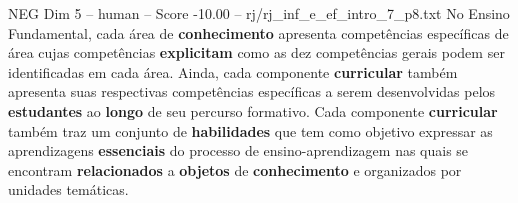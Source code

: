 \begin{textsample}{NEG Dim 5 – human – Score -10.00 – rj/rj\_inf\_e\_ef\_intro\_7\_p8.txt}  \label{ex:f5_neg_010}
No Ensino Fundamental, cada área de \textbf{conhecimento} apresenta competências específicas de área cujas competências \textbf{explicitam} como as dez competências gerais podem ser identificadas em cada área.
Ainda, cada componente \textbf{curricular} também apresenta suas respectivas competências específicas a serem desenvolvidas pelos \textbf{estudantes} ao \textbf{longo} de seu percurso formativo.
Cada componente \textbf{curricular} também traz um conjunto de \textbf{habilidades} que tem como objetivo expressar as aprendizagens \textbf{essenciais} do processo de ensino-aprendizagem nas quais se encontram \textbf{relacionados} a \textbf{objetos} de \textbf{conhecimento} e organizados por unidades temáticas.

\end{textsample}
